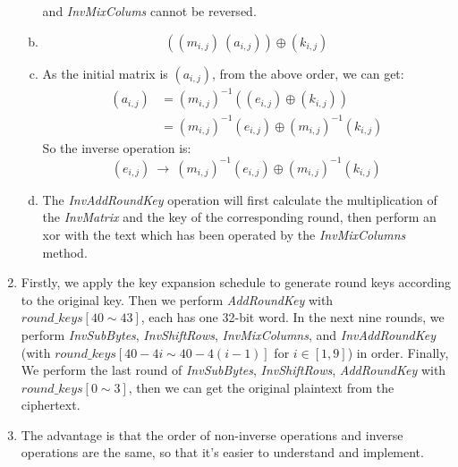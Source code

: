 \documentclass[12pt, a4paper]{article}
\begin{document}
\begin{enumerate}
\begin{enumerate}[a)]
                        and \emph{InvMixColums} cannot be reversed.
                  \item $$((m_{i,j})\ (a_{i,j})) \oplus (k_{i,j})$$
                  \item As the initial matrix is $(a_{i,j})$, from the above order, we can get:
                        \begin{align*}
                              (a_{i,j}) &= (m_{i,j})^{-1} ((e_{i,j}) \oplus (k_{i,j}))\\
                                        &= (m_{i,j})^{-1} (e_{i,j}) \oplus (m_{i,j})^{-1} (k_{i,j})
                        \end{align*}
                        So the inverse operation is:
                        $$(e_{i, j})\ \rightarrow \ (m_{i,j})^{-1} (e_{i,j}) \oplus (m_{i,j})^{-1} (k_{i,j})$$
                  \item The \emph{InvAddRoundKey} operation will first calculate the multiplication of the \emph{InvMatrix} 
                        and the key of the corresponding round, then perform an xor with the text which has been operated 
                        by the \emph{InvMixColumns} method.
            \end{enumerate}
      \item Firstly, we apply the key expansion schedule to generate round keys according to the original key. 
            Then we perform \emph{AddRoundKey} with $round\_keys[40 \sim 43]$, each has one 32-bit word.\newline
            In the next nine rounds, we perform \emph{InvSubBytes}, \emph{InvShiftRows}, \emph{InvMixColumns}, 
            and \emph{InvAddRoundKey} (with $round\_keys[40-4i \sim 40-4(i-1)]$ for $i \in [1, 9]$) in order.\newline
            Finally, We perform the last round of \emph{InvSubBytes}, \emph{InvShiftRows}, \emph{AddRoundKey} 
            with $round\_keys[0 \sim 3]$, then we can get the original plaintext from the ciphertext.
      \item The advantage is that the order of non-inverse operations and inverse operations are the same, 
            so that it's easier to understand and implement.
\end{enumerate}

\newpage
\end{document}

